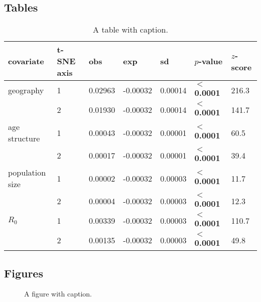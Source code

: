 \documentclass[12pt]{article}
\begin{document}
\clearpage










\clearpage
\subsection*{Tables}


\begin{table}[ht]
\centering
\caption{A table with caption. }
\label{tab:moran}
\begin{tabular}{lllllll}
  \hline
  covariate & t-SNE axis & obs & exp & sd & $p$-value & $z$-score \\
  \hline
  geography       & 1 & 0.02963 & -0.00032 & 0.00014 & \textbf{$<$ 0.0001} & 216.3 \\
                  & 2 & 0.01930 & -0.00032 & 0.00014 & \textbf{$<$ 0.0001} & 141.7 \\
  age structure   & 1 & 0.00043 & -0.00032 & 0.00001 & \textbf{$<$ 0.0001} & 60.5  \\
                  & 2 & 0.00017 & -0.00032 & 0.00001 & \textbf{$<$ 0.0001} & 39.4  \\
  population size & 1 & 0.00002 & -0.00032 & 0.00003 & \textbf{$<$ 0.0001} & 11.7  \\
                  & 2 & 0.00004 & -0.00032 & 0.00003 & \textbf{$<$ 0.0001} & 12.3  \\
  $R_0$           & 1 & 0.00339 & -0.00032 & 0.00003 & \textbf{$<$ 0.0001} & 110.7 \\
                  & 2 & 0.00135 & -0.00032 & 0.00003 & \textbf{$<$ 0.0001} & 49.8  \\

 \hline
\end{tabular}
\end{table}







\clearpage
\subsection*{Figures}

\begin{figure}[h!]
  \begin{center}
    \caption{A figure with caption. }
    \label{fig:concept}
  \end{center}
\end{figure}
\end{document}
